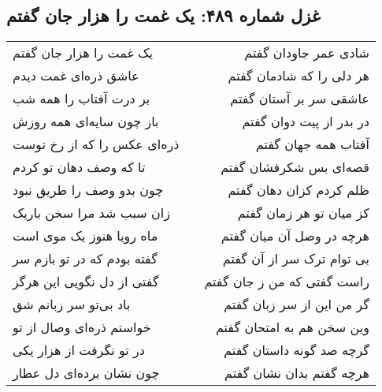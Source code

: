 \begin{center}
\section*{غزل شماره ۴۸۹: یک غمت را هزار جان گفتم}
\label{sec:489}
\begin{longtable}{l p{0.5cm} r}
یک غمت را هزار جان گفتم
&&
شادی عمر جاودان گفتم
\\
عاشق ذره‌ای غمت دیدم
&&
هر دلی را که شادمان گفتم
\\
بر درت آفتاب را همه شب
&&
عاشقی سر بر آستان گفتم
\\
باز چون سایه‌ای همه روزش
&&
در بدر از پیت دوان گفتم
\\
ذره‌ای عکس را که از رخ توست
&&
آفتاب همه جهان گفتم
\\
تا که وصف دهان تو کردم
&&
قصه‌ای بس شکرفشان گفتم
\\
چون بدو وصف را طریق نبود
&&
ظلم کردم کزان دهان گفتم
\\
زان سبب شد مرا سخن باریک
&&
کز میان تو هر زمان گفتم
\\
ماه رویا هنوز یک موی است
&&
هرچه در وصل آن میان گفتم
\\
گفته بودم که در تو بازم سر
&&
بی توام ترک سر از آن گفتم
\\
گفتی از دل نگویی این هرگز
&&
راست گفتی که من ز جان گفتم
\\
باد بی‌تو سر زبانم شق
&&
گر من این از سر زبان گفتم
\\
خواستم ذره‌ای وصال از تو
&&
وین سخن هم به امتحان گفتم
\\
در تو نگرفت از هزار یکی
&&
گرچه صد گونه داستان گفتم
\\
چون نشان برده‌ای دل عطار
&&
هرچه گفتم بدان نشان گفتم
\\
\end{longtable}
\end{center}
